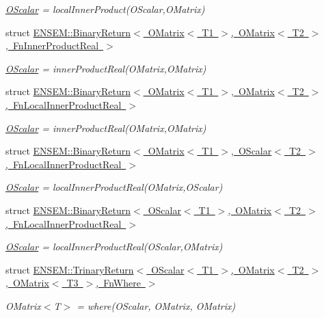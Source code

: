 \begin{DoxyCompactItemize}
\begin{DoxyCompactList}\small\item\em \mbox{\hyperlink{classENSEM_1_1OScalar}{O\+Scalar}} = local\+Inner\+Product(\+O\+Scalar,\+O\+Matrix) \end{DoxyCompactList}\item 
struct \mbox{\hyperlink{structENSEM_1_1BinaryReturn_3_01OMatrix_3_01T1_01_4_00_01OMatrix_3_01T2_01_4_00_01FnInnerProductReal_01_4}{E\+N\+S\+E\+M\+::\+Binary\+Return$<$ O\+Matrix$<$ T1 $>$, O\+Matrix$<$ T2 $>$, Fn\+Inner\+Product\+Real $>$}}
\begin{DoxyCompactList}\small\item\em \mbox{\hyperlink{classENSEM_1_1OScalar}{O\+Scalar}} = inner\+Product\+Real(\+O\+Matrix,\+O\+Matrix) \end{DoxyCompactList}\item 
struct \mbox{\hyperlink{structENSEM_1_1BinaryReturn_3_01OMatrix_3_01T1_01_4_00_01OMatrix_3_01T2_01_4_00_01FnLocalInnerProductReal_01_4}{E\+N\+S\+E\+M\+::\+Binary\+Return$<$ O\+Matrix$<$ T1 $>$, O\+Matrix$<$ T2 $>$, Fn\+Local\+Inner\+Product\+Real $>$}}
\begin{DoxyCompactList}\small\item\em \mbox{\hyperlink{classENSEM_1_1OScalar}{O\+Scalar}} = inner\+Product\+Real(\+O\+Matrix,\+O\+Matrix) \end{DoxyCompactList}\item 
struct \mbox{\hyperlink{structENSEM_1_1BinaryReturn_3_01OMatrix_3_01T1_01_4_00_01OScalar_3_01T2_01_4_00_01FnLocalInnerProductReal_01_4}{E\+N\+S\+E\+M\+::\+Binary\+Return$<$ O\+Matrix$<$ T1 $>$, O\+Scalar$<$ T2 $>$, Fn\+Local\+Inner\+Product\+Real $>$}}
\begin{DoxyCompactList}\small\item\em \mbox{\hyperlink{classENSEM_1_1OScalar}{O\+Scalar}} = local\+Inner\+Product\+Real(\+O\+Matrix,\+O\+Scalar) \end{DoxyCompactList}\item 
struct \mbox{\hyperlink{structENSEM_1_1BinaryReturn_3_01OScalar_3_01T1_01_4_00_01OMatrix_3_01T2_01_4_00_01FnLocalInnerProductReal_01_4}{E\+N\+S\+E\+M\+::\+Binary\+Return$<$ O\+Scalar$<$ T1 $>$, O\+Matrix$<$ T2 $>$, Fn\+Local\+Inner\+Product\+Real $>$}}
\begin{DoxyCompactList}\small\item\em \mbox{\hyperlink{classENSEM_1_1OScalar}{O\+Scalar}} = local\+Inner\+Product\+Real(\+O\+Scalar,\+O\+Matrix) \end{DoxyCompactList}\item 
struct \mbox{\hyperlink{structENSEM_1_1TrinaryReturn_3_01OScalar_3_01T1_01_4_00_01OMatrix_3_01T2_01_4_00_01OMatrix_3_01T3_01_4_00_01FnWhere_01_4}{E\+N\+S\+E\+M\+::\+Trinary\+Return$<$ O\+Scalar$<$ T1 $>$, O\+Matrix$<$ T2 $>$, O\+Matrix$<$ T3 $>$, Fn\+Where $>$}}
\begin{DoxyCompactList}\small\item\em O\+Matrix$<$\+T$>$ = where(\+O\+Scalar, O\+Matrix, O\+Matrix) \end{DoxyCompactList}\end{DoxyCompactItemize}
